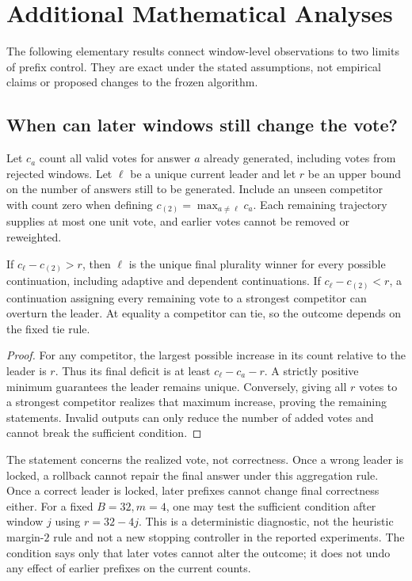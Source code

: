 \section{Additional Mathematical Analyses}
\label{app:additional_math}
The following elementary results connect window-level observations to two limits of prefix control. They are exact under the stated assumptions, not empirical claims or proposed changes to the frozen algorithm.

\subsection{When can later windows still change the vote?}
Let $c_a$ count all valid votes for answer $a$ already generated, including votes from rejected windows. Let $\ell$ be a unique current leader and let $r$ be an upper bound on the number of answers still to be generated. Include an unseen competitor with count zero when defining $c_{(2)}=\max_{a\ne\ell}c_a$. Each remaining trajectory supplies at most one unit vote, and earlier votes cannot be removed or reweighted.

\begin{proposition}
\label{prop:lock}
If $c_\ell-c_{(2)}>r$, then $\ell$ is the unique final plurality winner for every possible continuation, including adaptive and dependent continuations. If $c_\ell-c_{(2)}<r$, a continuation assigning every remaining vote to a strongest competitor can overturn the leader. At equality a competitor can tie, so the outcome depends on the fixed tie rule.
\end{proposition}
\begin{proof}
For any competitor, the largest possible increase in its count relative to the leader is $r$. Thus its final deficit is at least $c_\ell-c_a-r$. A strictly positive minimum guarantees the leader remains unique. Conversely, giving all $r$ votes to a strongest competitor realizes that maximum increase, proving the remaining statements. Invalid outputs can only reduce the number of added votes and cannot break the sufficient condition.
\end{proof}

The statement concerns the realized vote, not correctness. Once a wrong leader is locked, a rollback cannot repair the final answer under this aggregation rule. Once a correct leader is locked, later prefixes cannot change final correctness either. For a fixed $B=32,m=4$, one may test the sufficient condition after window $j$ using $r=32-4j$. This is a deterministic diagnostic, not the heuristic margin-$2$ rule and not a new stopping controller in the reported experiments. The condition says only that later votes cannot alter the outcome; it does not undo any effect of earlier prefixes on the current counts.

